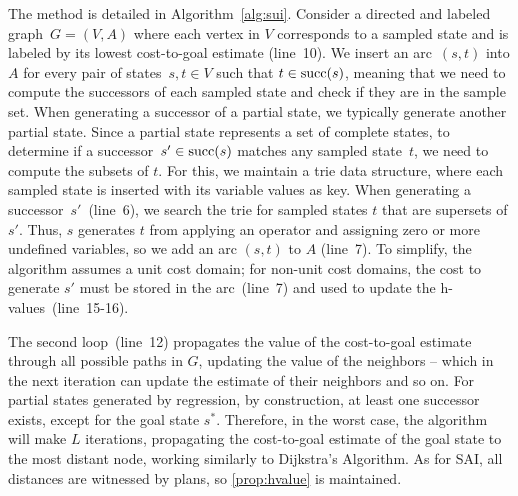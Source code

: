 The method is detailed in Algorithm~\ref{alg:sui}. Consider a directed and labeled graph~$G=(V,A)$ where each vertex in $V$ corresponds to a sampled state and is labeled by its lowest cost-to-goal estimate (line~10). We insert an arc~$(s,t)$ into $A$ for every pair of states~$s,t \in V$ such that $t \in \operatorname{succ}(s)$, meaning that we need to compute the successors of each sampled state and check if they are in the sample set. When generating a successor of a partial state, we typically generate another partial state. Since a partial state represents a set of complete states, to determine if a successor~$s' \in \operatorname{succ}(s)$ matches any sampled state~$t$, we need to compute the subsets of $t$. For this, we maintain a trie data structure, where each sampled state is inserted with its variable values as key. When generating a successor~$s'$~(line~6), we search the trie for sampled states $t$ that are supersets of $s'$. Thus, $s$ generates $t$ from applying an operator and assigning zero or more undefined variables, so we add an arc $(s,t)$ to $A$ (line~7). To simplify, the algorithm assumes a unit cost domain; for non-unit cost domains, the cost to generate $s'$ must be stored in the arc~(line~7) and used to update the h-values~(line~15-16).

The second loop~(line~12) propagates the value of the cost-to-goal estimate through all possible paths in $G$, updating the value of the neighbors -- which in the next iteration can update the estimate of their neighbors and so on. For partial states generated by regression, by construction, at least one successor exists, except for the goal state $s^*$. Therefore, in the worst case, the algorithm will make $L$ iterations, propagating the cost-to-goal estimate of the goal state to the most distant node, working similarly to Dijkstra's Algorithm. As for SAI, all distances are witnessed by plans, so \cref{prop:hvalue} is maintained.

